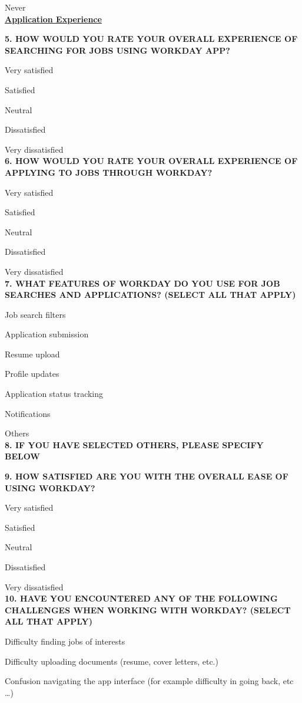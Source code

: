 \documentclass[
	letterpaper, %
]{jdf}
\begin{document}
\begin{sloppypar}
Never			
\\

\underline{\textbf{Application Experience  }}

\textbf{5. HOW WOULD YOU RATE YOUR OVERALL EXPERIENCE OF SEARCHING FOR JOBS  USING WORKDAY APP?}

Very satisfied

Satisfied

Neutral

Dissatisfied

Very dissatisfied \\



\textbf{6. HOW WOULD YOU RATE YOUR OVERALL EXPERIENCE OF APPLYING TO JOBS THROUGH WORKDAY?}

Very satisfied

Satisfied

Neutral

Dissatisfied

Very dissatisfied \\

\textbf{7. WHAT FEATURES OF WORKDAY DO YOU USE FOR JOB SEARCHES AND APPLICATIONS? (SELECT ALL THAT APPLY) }

Job search filters

Application submission

Resume upload

Profile updates

Application status tracking

Notifications

Others \\

\textbf{8. IF YOU HAVE SELECTED OTHERS, PLEASE SPECIFY BELOW
}

\textbf{9. HOW SATISFIED ARE YOU WITH THE OVERALL EASE OF USING WORKDAY?}

Very satisfied

Satisfied

Neutral

Dissatisfied

Very dissatisfied \\

\textbf{10. HAVE YOU ENCOUNTERED ANY OF THE FOLLOWING CHALLENGES WHEN WORKING WITH WORKDAY? (SELECT ALL THAT APPLY)
}

Difficulty finding jobs of interests

Difficulty uploading documents (resume, cover letters, etc.)

Confusion navigating the app interface (for example difficulty in going back, etc …)


\end{sloppypar}
\end{document}
